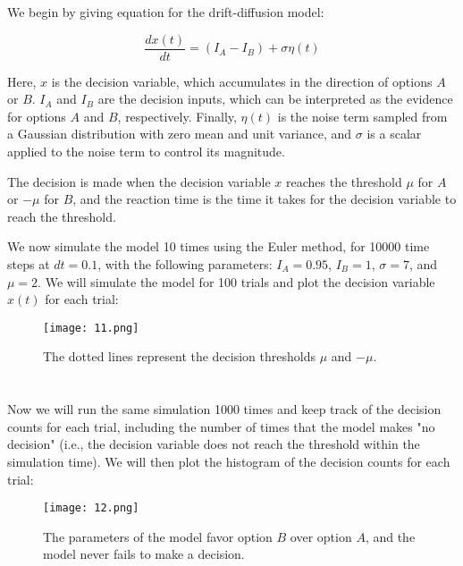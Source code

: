 \documentclass{article}
\begin{document}
We begin by giving equation for the drift-diffusion model: 

\begin{equation}
    \frac{dx(t)}{dt} = \left( I_A - I_B \right) + \sigma \eta(t)
\end{equation}
\vspace{.1em}

Here, $x$ is the decision variable, which accumulates in the direction of options $A$ or $B$. $I_A$ and $I_B$ are the decision inputs, which can be interpreted as the evidence for options $A$ and $B$, respectively. Finally, $\eta(t)$ is the noise term sampled from a Gaussian distribution with zero mean and unit variance, and $\sigma$ is a scalar applied to the noise term to control its magnitude.
\vspace{1em}

The decision is made when the decision variable $x$ reaches the threshold $\mu$ for $A$ or $-\mu$ for $B$, and the reaction time is the time it takes for the decision variable to reach the threshold.
\vspace{1em}

We now simulate the model 10 times using the Euler method, for 10000 time steps at $dt = 0.1$, with the following parameters: $I_A = 0.95$, $I_B = 1$, $\sigma = 7$, and $\mu = 2$. We will simulate the model for 100 trials and plot the decision variable $x(t)$ for each trial: 

\begin{figure}[ht]
    \centering
    \texttt{[image: 11.png]}
    \caption{The dotted lines represent the decision thresholds $\mu$ and $-\mu$.}
\end{figure}
\vspace{-1em}


\section{}
Now we will run the same simulation 1000 times and keep track of the decision counts for each trial, including the number of times that the model makes "no decision" (i.e., the decision variable does not reach the threshold within the simulation time). We will then plot the histogram of the decision counts for each trial:

\begin{figure}[ht]
    \centering
    \texttt{[image: 12.png]}
    \caption{The parameters of the model favor option $B$ over option $A$, and the model never fails to make a decision.}
\end{figure}
\end{document}
